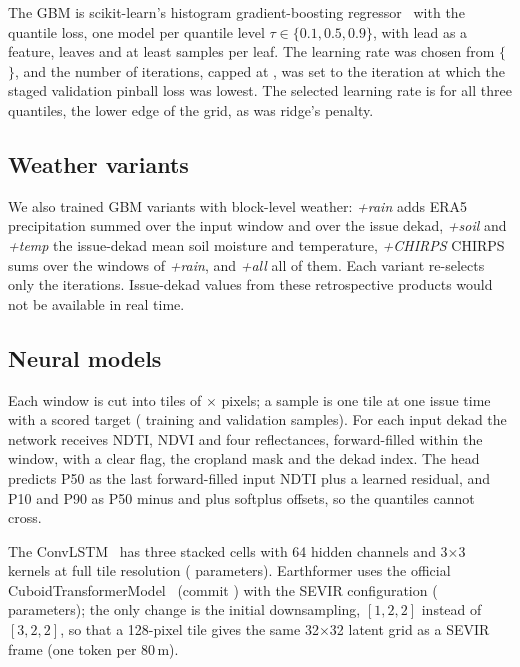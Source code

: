 \documentclass[journal]{IEEEtran}
\begin{document}
The GBM is scikit-learn's histogram gradient-boosting regressor~\cite{sklearn} with the quantile loss, one model per quantile level $\tau\in\{0.1,0.5,0.9\}$, with lead as a feature, \finxGbmLeaves{} leaves and at least \finxGbmMinLeaf{} samples per leaf. The learning rate was chosen from $\{$\finxGbmLRGrid$\}$, and the number of iterations, capped at \finxGbmCap, was set to the iteration at which the staged validation pinball loss was lowest. The selected learning rate is \finGbmLrFifty{} for all three quantiles, the lower edge of the grid, as was ridge's penalty.

\subsection{Weather variants}
We also trained GBM variants with block-level weather: \emph{+rain} adds ERA5 precipitation summed over the input window and over the issue dekad, \emph{+soil} and \emph{+temp} the issue-dekad mean soil moisture and temperature, \emph{+CHIRPS} CHIRPS sums over the windows of \emph{+rain}, and \emph{+all} all of them. Each variant re-selects only the iterations. Issue-dekad values from these retrospective products would not be available in real time.

\subsection{Neural models}
Each window is cut into \finxTilesPerWindow{} tiles of \finxPatch$\times$\finxPatch{} pixels; a sample is one tile at one issue time with a scored target (\finxNTrainSamples{} training and \finxNValSamples{} validation samples). For each input dekad the network receives NDTI, NDVI and four reflectances, forward-filled within the window, with a clear flag, the cropland mask and the dekad index. The head predicts P50 as the last forward-filled input NDTI plus a learned residual, and P10 and P90 as P50 minus and plus softplus offsets, so the quantiles cannot cross.

The ConvLSTM~\cite{convlstm} has three stacked cells with 64 hidden channels and 3$\times$3 kernels at full tile resolution (\finConvLSTMSeedOneParams{} parameters). Earthformer uses the official CuboidTransformerModel~\cite{earthformercode} (commit \finxEFCommit) with the SEVIR configuration (\finEarthformerSeedOneParams{} parameters); the only change is the initial downsampling, $[1,2,2]$ instead of $[3,2,2]$, so that a 128-pixel tile gives the same 32$\times$32 latent grid as a SEVIR frame (one token per 80\,m).
\end{document}
